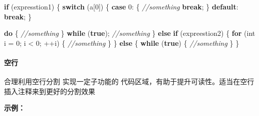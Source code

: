 \documentclass[
]{article}
\newenvironment{Shaded}{}{}
\newcommand{\CommentTok}[1]{\textcolor[rgb]{0.38,0.63,0.69}{\textit{#1}}}
\newcommand{\ControlFlowTok}[1]{\textcolor[rgb]{0.00,0.44,0.13}{\textbf{#1}}}
\newcommand{\DataTypeTok}[1]{\textcolor[rgb]{0.56,0.13,0.00}{#1}}
\newcommand{\DecValTok}[1]{\textcolor[rgb]{0.25,0.63,0.44}{#1}}
\newcommand{\KeywordTok}[1]{\textcolor[rgb]{0.00,0.44,0.13}{\textbf{#1}}}
\newcommand{\NormalTok}[1]{#1}
\newcommand{\OperatorTok}[1]{\textcolor[rgb]{0.40,0.40,0.40}{#1}}
\begin{document}
\begin{Shaded}
\begin{Highlighting}[]
\ControlFlowTok{if} \OperatorTok{(}\NormalTok{expresstion1}\OperatorTok{)} \OperatorTok{\{}
	\ControlFlowTok{switch} \OperatorTok{(}\NormalTok{a}\OperatorTok{[}\DecValTok{0}\OperatorTok{])}
	\OperatorTok{\{}
	\ControlFlowTok{case} \DecValTok{0}\OperatorTok{:} \OperatorTok{\{}
		\CommentTok{//something}
		\ControlFlowTok{break}\OperatorTok{;}
	\OperatorTok{\}}
	\ControlFlowTok{default}\OperatorTok{:}
		\ControlFlowTok{break}\OperatorTok{;}
	\OperatorTok{\}}

	\ControlFlowTok{do} \OperatorTok{\{}
		\CommentTok{//something}
	\OperatorTok{\}} \ControlFlowTok{while} \OperatorTok{(}\KeywordTok{true}\OperatorTok{);}
	\CommentTok{//something}
\OperatorTok{\}} \ControlFlowTok{else} \ControlFlowTok{if} \OperatorTok{(}\NormalTok{expreestion2}\OperatorTok{)} \OperatorTok{\{}
	\ControlFlowTok{for} \OperatorTok{(}\DataTypeTok{int}\NormalTok{ i }\OperatorTok{=} \DecValTok{0}\OperatorTok{;}\NormalTok{ i }\OperatorTok{\textless{}} \DecValTok{0}\OperatorTok{;} \OperatorTok{++}\NormalTok{i}\OperatorTok{)} \OperatorTok{\{}
		\CommentTok{//something}
	\OperatorTok{\}}
\OperatorTok{\}} \ControlFlowTok{else} \OperatorTok{\{}
	\ControlFlowTok{while} \OperatorTok{(}\KeywordTok{true}\OperatorTok{)} \OperatorTok{\{}
		\CommentTok{//something}
	\OperatorTok{\}}
\OperatorTok{\}}
\end{Highlighting}
\end{Shaded}

\hypertarget{ux7a7aux884c}{%
\paragraph{空行}\label{ux7a7aux884c}}

合理利用空行分割 实现一定子功能的
代码区域，有助于提升可读性。适当在空行插入注释来到更好的分割效果

\textbf{示例：}
\end{document}
